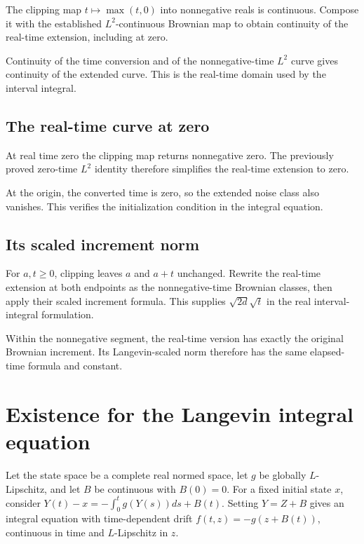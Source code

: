 \documentclass[11pt,a4paper]{article}
\begin{document}
The clipping map \(t\mapsto\max(t,0)\) into nonnegative reals is continuous. Compose it with the established \(L^2\)-continuous Brownian map to obtain continuity of the real-time extension, including at zero.



Continuity of the time conversion and of the nonnegative-time \(L^2\) curve gives continuity of the extended curve. This is the real-time domain used by the interval integral.


\subsection{\texorpdfstring{The real-time curve at zero}{The real-time curve at zero}}


At real time zero the clipping map returns nonnegative zero. The previously proved zero-time \(L^2\) identity therefore simplifies the real-time extension to zero.



At the origin, the converted time is zero, so the extended noise class also vanishes. This verifies the initialization condition in the integral equation.


\subsection{\texorpdfstring{Its scaled increment norm}{Its scaled increment norm}}


For \(a,t\ge0\), clipping leaves \(a\) and \(a+t\) unchanged. Rewrite the real-time extension at both endpoints as the nonnegative-time Brownian classes, then apply their scaled increment formula. This supplies \(\sqrt{2d}\sqrt t\) in the real interval-integral formulation.



Within the nonnegative segment, the real-time version has exactly the original Brownian increment. Its Langevin-scaled norm therefore has the same elapsed-time formula and constant.


\section{\texorpdfstring{Existence for the Langevin integral equation}{Existence for the Langevin integral equation}}


Let the state space be a complete real normed space, let \(g\) be globally \(L\)-Lipschitz, and let \(B\) be continuous with \(B(0)=0\). For a fixed initial state \(x\), consider \(Y(t)-x=-\int_0^tg(Y(s))ds+B(t)\). Setting \(Y=Z+B\) gives an integral equation with time-dependent drift \(f(t,z)=-g(z+B(t))\), continuous in time and \(L\)-Lipschitz in \(z\).
\end{document}
